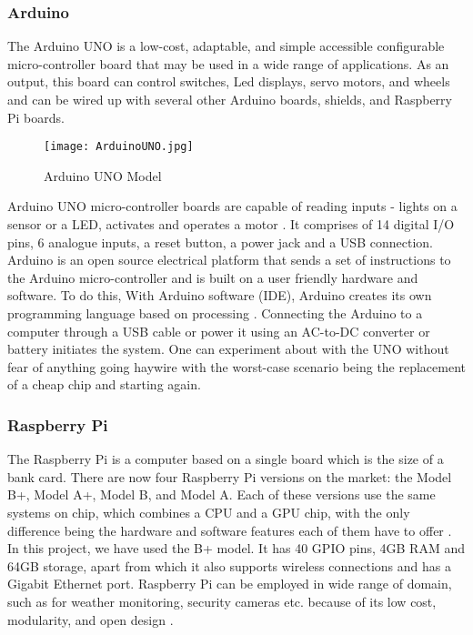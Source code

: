 \documentclass[conference,a4paper]{IEEEtran}
\begin{document}
\subsubsection{Arduino}
The Arduino UNO is a low-cost, adaptable, and simple accessible configurable micro-controller board that may be used in a wide range of applications. As an output, this board can control switches, Led displays, servo motors, and wheels and can be wired up with several other Arduino boards, shields, and Raspberry Pi boards.

\begin{figure}[ht]
\centering
\texttt{[image: ArduinoUNO.jpg]}
\caption{Arduino UNO Model}
\label{Fig: Model}
\end{figure}

Arduino UNO micro-controller boards are capable of reading inputs - lights on a sensor or a LED, activates and operates a motor \cite{5}. It comprises of 14 digital I/O pins, 6 analogue inputs, a reset button, a power jack and a USB connection. 
Arduino is an open source electrical platform that sends a set of instructions to the Arduino micro-controller and is built on a user friendly hardware and software. To do this, With Arduino software (IDE), Arduino creates its own programming language based on processing \cite{10}. 
Connecting the Arduino to a computer through a USB cable or power it using an AC-to-DC converter or battery initiates the system\cite{10}. One can experiment about with the UNO without fear of anything going haywire with the worst-case scenario being the replacement of a cheap chip and starting again.

\subsubsection{Raspberry Pi}
The Raspberry Pi is a computer based on a single board which is the size of a bank card. There are now four Raspberry Pi versions on the market: the Model B+, Model A+, Model B, and Model A. Each of these versions use the same systems on chip, which combines a CPU and a GPU chip, with the only difference being the hardware and software features each of them have to offer \cite{4}.
In this project, we have used the B+ model. It has 40 GPIO pins, 4GB RAM and 64GB storage, apart from which it also supports wireless connections and has a Gigabit Ethernet port. Raspberry Pi can be employed in wide range of domain, such as for weather monitoring, security cameras etc. because of its low cost, modularity, and open design \cite{12}.
\end{document}
